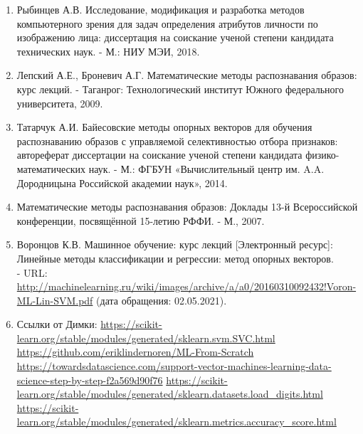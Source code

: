 \documentclass[12pt,a4paper]{article}
\begin{document}
\begin{enumerate}
    \item Рыбинцев А.В. Исследование, модификация и разработка методов компьютерного зрения для задач определения атрибутов личности по изображению лица: диссертация на соискание ученой степени кандидата технических наук. - М.: НИУ МЭИ, 2018.
    \item Лепский А.Е., Броневич А.Г. Математические методы распознавания образов: курс лекций. - Таганрог: Технологический институт Южного федерального университета, 2009.
    \item Татарчук А.И. Байесовские методы опорных векторов для обучения распознаванию образов с управляемой селективностью отбора признаков: автореферат диссертации на соискание ученой степени кандидата физико-математических наук. - М.: ФГБУН «Вычислительный центр им. A.A. Дородницына Российской академии наук», 2014.
    \item Математические методы распознавания образов: Доклады 13-й Всероссийской конференции, посвящённой 15-летию РФФИ. - М., 2007.
    \item Воронцов К.В. Машинное обучение: курс лекций [Электронный ресурс]: Линейные методы классификации и регрессии: метод опорных векторов.\\ - URL: \url{http://machinelearning.ru/wiki/images/archive/a/a0/20160310092432!Voron-ML-Lin-SVM.pdf} (дата обращения: 02.05.2021).
    \item Ссылки от Димки: \url{https://scikit-learn.org/stable/modules/generated/sklearn.svm.SVC.html} \url{https://github.com/eriklindernoren/ML-From-Scratch} \url{https://towardsdatascience.com/support-vector-machines-learning-data-science-step-by-step-f2a569d90f76} \url{https://scikit-learn.org/stable/modules/generated/sklearn.datasets.load_digits.html} \url{https://scikit-learn.org/stable/modules/generated/sklearn.metrics.accuracy_score.html} 
\end{enumerate}
\end{document}
